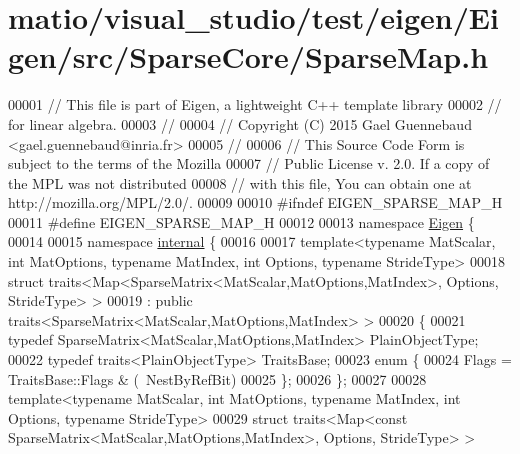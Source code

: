 \hypertarget{matio_2visual__studio_2test_2eigen_2_eigen_2src_2_sparse_core_2_sparse_map_8h_source}{}\section{matio/visual\+\_\+studio/test/eigen/\+Eigen/src/\+Sparse\+Core/\+Sparse\+Map.h}
\label{matio_2visual__studio_2test_2eigen_2_eigen_2src_2_sparse_core_2_sparse_map_8h_source}

\begin{DoxyCode}
00001 \textcolor{comment}{// This file is part of Eigen, a lightweight C++ template library}
00002 \textcolor{comment}{// for linear algebra.}
00003 \textcolor{comment}{//}
00004 \textcolor{comment}{// Copyright (C) 2015 Gael Guennebaud <gael.guennebaud@inria.fr>}
00005 \textcolor{comment}{//}
00006 \textcolor{comment}{// This Source Code Form is subject to the terms of the Mozilla}
00007 \textcolor{comment}{// Public License v. 2.0. If a copy of the MPL was not distributed}
00008 \textcolor{comment}{// with this file, You can obtain one at http://mozilla.org/MPL/2.0/.}
00009 
00010 \textcolor{preprocessor}{#ifndef EIGEN\_SPARSE\_MAP\_H}
00011 \textcolor{preprocessor}{#define EIGEN\_SPARSE\_MAP\_H}
00012 
00013 \textcolor{keyword}{namespace }\hyperlink{namespace_eigen}{Eigen} \{
00014 
00015 \textcolor{keyword}{namespace }\hyperlink{namespaceinternal}{internal} \{
00016 
00017 \textcolor{keyword}{template}<\textcolor{keyword}{typename} MatScalar, \textcolor{keywordtype}{int} MatOptions, \textcolor{keyword}{typename} MatIndex, \textcolor{keywordtype}{int} Options, \textcolor{keyword}{typename} Str\textcolor{keywordtype}{id}eType>
00018 \textcolor{keyword}{struct }traits<Map<SparseMatrix<MatScalar,MatOptions,MatIndex>, Options, StrideType> >
00019   : \textcolor{keyword}{public} traits<SparseMatrix<MatScalar,MatOptions,MatIndex> >
00020 \{
00021   \textcolor{keyword}{typedef} SparseMatrix<MatScalar,MatOptions,MatIndex> PlainObjectType;
00022   \textcolor{keyword}{typedef} traits<PlainObjectType> TraitsBase;
00023   \textcolor{keyword}{enum} \{
00024     Flags = TraitsBase::Flags & (~NestByRefBit)
00025   \};
00026 \};
00027 
00028 \textcolor{keyword}{template}<\textcolor{keyword}{typename} MatScalar, \textcolor{keywordtype}{int} MatOptions, \textcolor{keyword}{typename} MatIndex, \textcolor{keywordtype}{int} Options, \textcolor{keyword}{typename} Str\textcolor{keywordtype}{id}eType>
00029 \textcolor{keyword}{struct }traits<Map<const SparseMatrix<MatScalar,MatOptions,MatIndex>, Options, StrideType> >

\end{DoxyCode}

